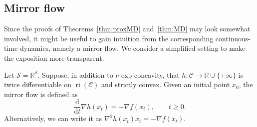 \documentclass[a4paper]{article}
\renewcommand{\geq}{\geqslant}
\newcommand{\CC}{\mathcal{C}}
\renewcommand{\SS}{\mathcal{S}}
\newcommand{\R}{\mathbb{R}}
\newcommand{\drv}{\frac{\mathrm{d}}{\mathrm{d}t}}
\newcommand{\dotx}{\dot{x}}
\DeclareMathOperator{\ri}{ri}
\begin{document}
\subsection{Mirror flow}\label{sec:mirror_flow}
Since the proofs of Theorems~\ref{thm:proxMD} and~\ref{thm:MD} may look somewhat involved, it might be useful to gain intuition from the corresponding continuous-time dynamics, namely a mirror flow. We consider a simplified setting to make the exposition more transparent.

Let $\SS = \R^d$.
Suppose, in addition to $\nu$-exp-concavity, that $h\colon \CC\to\R\cup\{+\infty\}$ is twice differentiable on $\ri(\CC)$ and strictly convex. Given an initial point $x_0$, the mirror flow is defined as
\begin{equation}
  \label{eq:mf}
\drv \nabla h(x_t) = - \nabla f(x_t), \qquad t\geq 0.
\end{equation}
Alternatively, we can write it as $\nabla^2 h(x_t) \dotx_t = - \nabla f(x_t)$.
\end{document}
